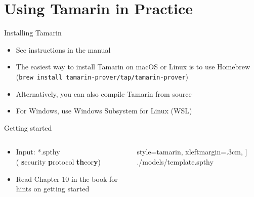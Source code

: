 \documentclass[11pt,aspectratio=169]{beamer}
\begin{document}

\section{Using Tamarin in Practice}


\begin{frame}[fragile]{Installing Tamarin}
    \begin{itemize}
        \item See instructions in the manual
        \item The easiest way to install Tamarin on macOS or Linux is to use 
              Homebrew (\verb|brew install tamarin-prover/tap/tamarin-prover|)
        \item Alternatively, you can also compile Tamarin from source
        \item For Windows, use Windows Subsystem for Linux (WSL)
    \end{itemize}
\end{frame}

\begin{frame}[fragile]{Getting started}
    \begin{columns}
        \begin{column}{0.5\textwidth}
            \begin{itemize}
                \item Input: *.spthy\\(
                      \textbf{s}ecurity \textbf{p}rotocol
                      \textbf{th}eor\textbf{y})
                \item Read Chapter 10 in the book for hints on getting started
            \end{itemize}
        \end{column}
        \begin{column}{0.5\textwidth}
            \vspace*{-.4cm}
            
                style=tamarin,
                xleftmargin=.3cm,
            ] {./models/template.spthy}
        \end{column}
    \end{columns}
    \vsep
\end{frame}
\end{document}
